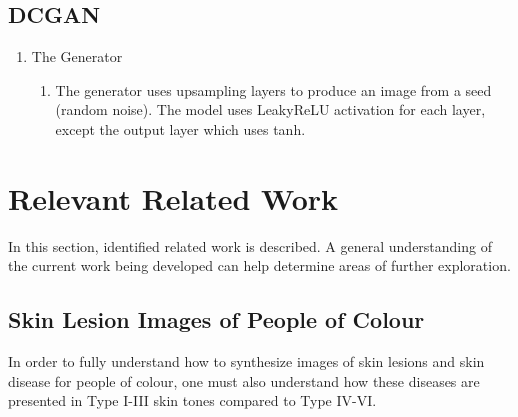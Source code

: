 \documentclass{IEEEtran}
\begin{document}
         \subsection{DCGAN}
             \begin{enumerate}
                 \item The Generator
                    \begin{enumerate}
                        \item {The generator uses upsampling layers to produce an image from a seed (random noise). The model uses LeakyReLU activation for each layer, except the output layer which uses tanh.}
                    \end{enumerate}
             \end{enumerate}

\section{Relevant Related Work}
    {In this section, identified related work is described. A general understanding of the current work being developed can help determine areas of further exploration.}
    \subsection{Skin Lesion Images of People of Colour}
        {In order to fully understand how to synthesize images of skin lesions and skin disease for people of colour, one must also understand how these diseases are presented in Type I-III skin tones compared to Type IV-VI.}

  \newpage
  \printbibliography
\end{document}
